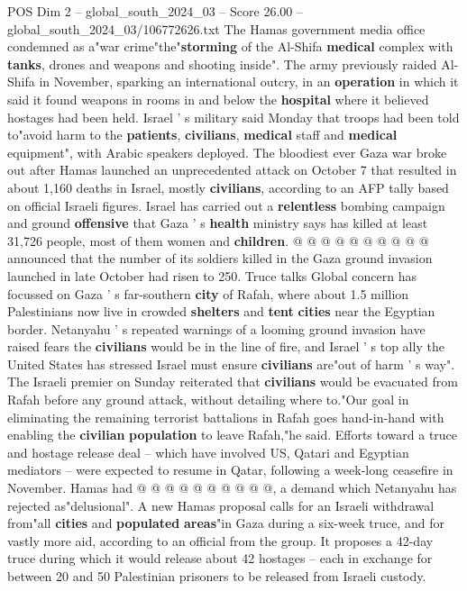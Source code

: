 \begin{textsample}{POS Dim 2 – global\_south\_2024\_03 – Score 26.00 – global\_south\_2024\_03/106772626.txt}
The Hamas government media office condemned as a"war crime"the"\textbf{storming} of the Al-Shifa \textbf{medical} complex with \textbf{tanks}, drones and weapons and shooting inside".
The army previously raided Al-Shifa in November, sparking an international outcry, in an \textbf{operation} in which it said it found weapons in rooms in and below the \textbf{hospital} where it believed hostages had been held.
Israel ' s military said Monday that troops had been told to"avoid harm to the \textbf{patients}, \textbf{civilians}, \textbf{medical} staff and \textbf{medical} equipment", with Arabic speakers deployed.
The bloodiest ever Gaza war broke out after Hamas launched an unprecedented attack on October 7 that resulted in about 1,160 deaths in Israel, mostly \textbf{civilians}, according to an AFP tally based on official Israeli figures.
Israel has carried out a \textbf{relentless} bombing campaign and ground \textbf{offensive} that Gaza ' s \textbf{health} ministry says has killed at least 31,726 people, most of them women and \textbf{children}. @ @ @ @ @ @ @ @ @ @ announced that the number of its soldiers killed in the Gaza ground invasion launched in late October had risen to 250.
Truce talks Global concern has focussed on Gaza ' s far-southern \textbf{city} of Rafah, where about 1.5 million Palestinians now live in crowded \textbf{shelters} and \textbf{tent} \textbf{cities} near the Egyptian border.
Netanyahu ' s repeated warnings of a looming ground invasion have raised fears the \textbf{civilians} would be in the line of fire, and Israel ' s top ally the United States has stressed Israel must ensure \textbf{civilians} are"out of harm ' s way".
The Israeli premier on Sunday reiterated that \textbf{civilians} would be evacuated from Rafah before any ground attack, without detailing where to."Our goal in eliminating the remaining terrorist battalions in Rafah goes hand-in-hand with enabling the \textbf{civilian} \textbf{population} to leave Rafah,"he said.
Efforts toward a truce and hostage release deal -- which have involved US, Qatari and Egyptian mediators -- were expected to resume in Qatar, following a week-long ceasefire in November.
Hamas had @ @ @ @ @ @ @ @ @ @, a demand which Netanyahu has rejected as"delusional".
A new Hamas proposal calls for an Israeli withdrawal from"all \textbf{cities} and \textbf{populated} \textbf{areas}"in Gaza during a six-week truce, and for vastly more aid, according to an official from the group.
It proposes a 42-day truce during which it would release about 42 hostages -- each in exchange for between 20 and 50 Palestinian prisoners to be released from Israeli custody.

\end{textsample}
